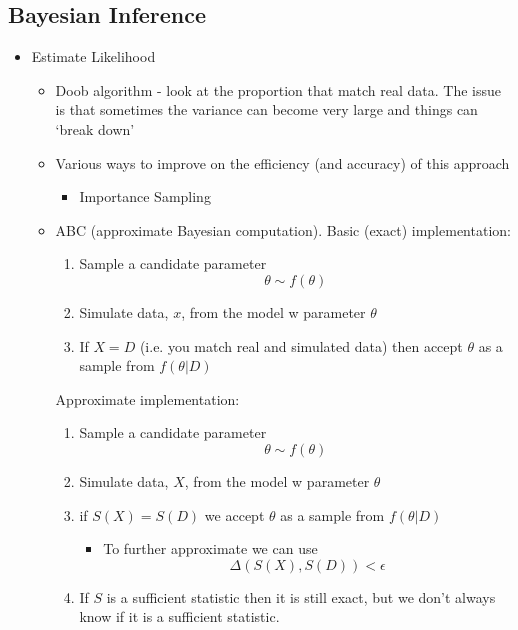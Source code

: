 \documentclass{X:/Documents/Coding/Latex/myassignment}
\begin{document}
\subsection{Bayesian Inference}
\begin{itemize}
    \item Estimate Likelihood
    \begin{itemize}
        \item Doob algorithm - look at the proportion that match real data. The issue is that sometimes the variance can become very large and things can `break down'
        \item Various ways to improve on the efficiency (and accuracy) of this approach
        \begin{itemize}
            \item Importance Sampling
        \end{itemize}
        \item ABC  (approximate Bayesian computation). Basic (exact) implementation:
        \begin{enumerate}
            \item Sample a candidate parameter
            \[\theta \sim f(\theta)\]
            \item Simulate data, $x$, from the model w parameter $\theta$
            \item If $X=D$ (i.e. you match real and simulated data) then accept $\theta$ as a sample from $f(\theta | D)$
        \end{enumerate}
        Approximate implementation:
        \begin{enumerate}
            \item Sample a candidate parameter
            \[\theta \sim f(\theta)\]
            \item Simulate data, $X$, from the model w parameter $\theta$
            \item if $S(X) = S(D)$ we accept $\theta$ as a sample from $f(\theta|D) $
            \begin{itemize}
                \item To further approximate we can use
                \[\Delta(S(X),S(D)) < \epsilon\]
            \end{itemize}
            \item If $S$ is a sufficient statistic then it is still exact, but we don't always know if it is a sufficient statistic.
        \end{enumerate}


\end{itemize}
\end{itemize}
\end{document}
